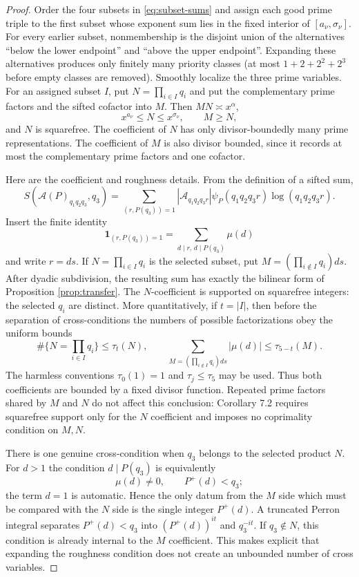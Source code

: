 \documentclass[10pt,reqno]{amsart}
\newcommand{\Acal}{\mathcal{A}}
\newcommand{\1}{\mathbf{1}}
\theoremstyle{plain}
\theoremstyle{remark}
\begin{document}
\begin{proof}
Order the four subsets in \eqref{eq:subset-sums} and assign each good prime
triple to the first subset whose exponent sum lies in the fixed interior of
$[a_\nu,\sigma_\nu]$.  For every earlier subset, nonmembership is the disjoint union
of the alternatives ``below the lower endpoint'' and ``above the upper
endpoint''.  Expanding these alternatives produces only finitely many
priority classes (at most $1+2+2^2+2^3$ before empty classes are removed).
Smoothly localize the three prime variables.  For an assigned
subset $I$, put $N=\prod_{i\in I}q_i$ and put the complementary prime factors
and the sifted cofactor into $M$.  Then $MN\asymp x^\alpha$,
\[
 x^{a_\nu}\le N\le x^{\sigma_\nu},\qquad M\ge N,
\]
and $N$ is squarefree.  The coefficient of $N$ has only divisor-boundedly
many prime representations.  The coefficient of $M$ is also divisor
bounded, since it records at most the complementary prime factors and one
cofactor.

Here are the coefficient and roughness details.  From the definition of a
sifted sum,
\[
 S(\Acal(P)_{q_1q_2q_3},q_3)
 =\sum_{(r,P(q_3))=1}|\Acal_{q_1q_2q_3r}|
   \psi_P(q_1q_2q_3r)\log(q_1q_2q_3r).
\]
Insert the finite identity
\[
 \1_{(r,P(q_3))=1}
   =\sum_{d\mid r,\,d\mid P(q_3)}\mu(d)
\]
and write $r=ds$.  If $N=\prod_{i\in I}q_i$ is the selected subset,
put $M=(\prod_{i\notin I}q_i)ds$.  After dyadic subdivision, the resulting
sum has exactly the bilinear form of Proposition \ref{prop:transfer}.
The $N$-coefficient is supported on squarefree integers: the selected
$q_i$ are distinct.  More quantitatively, if $t=|I|$, then before the
separation of cross-conditions the numbers of possible factorizations obey
the uniform bounds
\[
 \#\{N=\textstyle\prod_{i\in I}q_i\}\le \tau_t(N),\qquad
 \sum_{M=(\prod_{i\notin I}q_i)ds}|\mu(d)|
       \le \tau_{5-t}(M).
\]
The harmless conventions $\tau_0(1)=1$ and
$\tau_j\le\tau_5$ may be used.  Thus both coefficients are bounded by a
fixed divisor function.  Repeated prime factors shared by $M$ and $N$ do
not affect this conclusion: Corollary 7.2 requires squarefree support only
for the $N$ coefficient and imposes no coprimality condition on $M,N$.

There is one genuine cross-condition when $q_3$ belongs to the selected
product $N$.  For $d>1$ the condition $d\mid P(q_3)$ is equivalently
\[
 \mu(d)\ne0,\qquad P^+(d)<q_3;
\]
the term $d=1$ is automatic.  Hence the only datum from the $M$ side which
must be compared with the $N$ side is the single integer $P^+(d)$.  A
truncated Perron integral separates
$P^+(d)<q_3$ into $(P^+(d))^{it}$ and $q_3^{-it}$.  If $q_3\notin N$, this
condition is already internal to the $M$ coefficient.  This makes explicit
that expanding the roughness condition does not create an unbounded number
of cross variables.


\end{proof}
\end{document}
